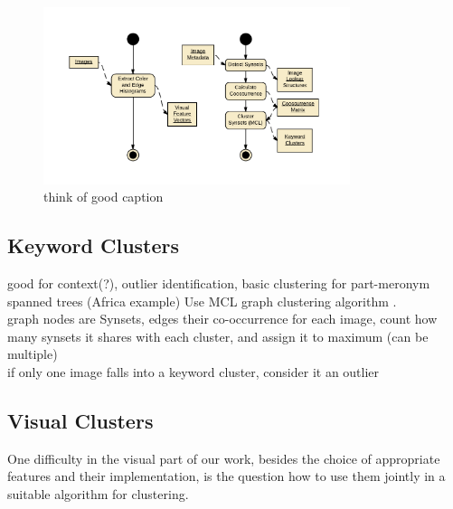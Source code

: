 \begin{figure}[h]
\includegraphics[width=0.8\textwidth]{images/precalcs_activity_diagram.pdf}
\caption{think of good caption}
\label{fig_precalcprocess}
\end{figure}


\subsection{Keyword Clusters}
\label{sec_keywordclustering}
good for context(?), outlier identification, basic clustering for part-meronym spanned trees (Africa example)
\bigskip
Use MCL graph clustering algorithm\cite{Dongen1998} .\\
graph nodes are Synsets, edges their co-occurrence
\bigskip
for each image, count how many synsets it shares with each cluster, and assign it to maximum (can be multiple)\\
if only one image falls into a keyword cluster, consider it an outlier

\subsection{Visual Clusters}
\label{sec_visualclustering}

One difficulty in the visual part of our work, besides the choice of appropriate features and their implementation, is the question how to use them jointly in a suitable algorithm for clustering. 

